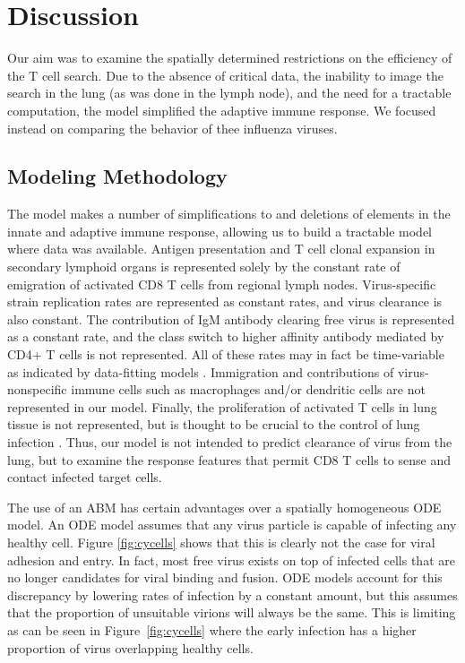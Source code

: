 \documentclass[10pt]{article}
\begin{document}
\section*{Discussion}

Our aim was to examine the spatially determined restrictions on the efficiency of the T cell search.  Due to the absence of critical data, the inability to image the search in the lung (as was done in the lymph node), and the need for a tractable computation, the model simplified the adaptive immune response.  We focused instead on comparing the behavior of thee influenza viruses.

\subsection*{Modeling Methodology}

The model makes a number of simplifications to and deletions of elements in the innate and adaptive immune response, allowing us to build a tractable model where data was available.  Antigen presentation and T cell clonal expansion in secondary lymphoid organs is represented solely by the constant rate of emigration of activated CD8 T cells from regional lymph nodes.  Virus-specific strain replication rates are represented as constant rates, and virus clearance is also constant.  The contribution of IgM antibody clearing free virus is represented as a constant rate, and the class switch to higher affinity antibody mediated by CD4+ T cells is not represented.  All of these rates may in fact be time-variable as indicated by data-fitting models \cite{Wu2011}.  Immigration and contributions of virus-nonspecific immune cells such as macrophages and/or dendritic cells are not represented in our model.  Finally, the proliferation of activated T cells in lung tissue is not represented, but is thought to be crucial to the control of lung infection \cite{Miao2010}.  Thus, our model is not intended to predict clearance of virus from the lung, but to examine the response  features that permit CD8 T cells to sense and contact infected target cells.

The use of an ABM has certain advantages over a spatially homogeneous ODE model.  An ODE model assumes that any virus particle is capable of infecting any healthy cell.  Figure \ref{fig:cycells} shows that this is clearly not the case for viral adhesion and entry.  In fact, most free virus exists on top of infected cells that are no longer candidates for viral binding and fusion.  ODE models account for this discrepancy by lowering rates of infection by a constant amount, but this assumes that the proportion of unsuitable virions will always be the same.  This is limiting as can be seen in Figure~\ref{fig:cycells} where the early infection has a higher proportion of virus overlapping healthy cells.
\end{document}
